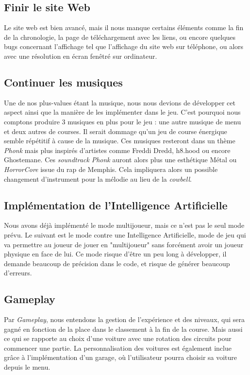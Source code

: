 \documentclass[12pt,a4paper]{article}
\newcommand{\AI}{Intelligence Artificielle}
\begin{document}
    \subsection{Finir le site Web}
        Le site web est bien avancé, mais il nous manque certains éléments 
        comme la fin de la chronologie, la page de téléchargement avec les liens,
        ou encore quelques bugs concernant l'affichage tel que l'affichage du
        site web sur téléphone, ou alors avec une résolution en écran fenêtré sur ordinateur.
        
    \subsection{Continuer les musiques}
        Une de nos plus-values étant la musique, nous nous devions de développer cet aspect
        ainsi que la manière de les implémenter dans le jeu. C'est pourquoi nous comptons
        produire 3 musiques en plus pour le jeu : une autre musique de menu et deux autres
        de courses. Il serait dommage qu'un jeu de course énergique semble répétitif à cause
        de la musique. Ces musiques resteront dans un thème \textsl{Phonk} mais plus inspirés d'artistes
        comme Freddi Dredd, h8.hood ou encore Ghostemane. Ces \textit{soundtrack} \textit{Phonk} auront alors plus
        une esthétique Métal ou \textit{HorrorCore} issue du rap de Memphis. Cela impliquera alors 
        un possible changement d'instrument pour la mélodie au lieu de la \textit{cowbell}.
        
    \subsection{Implémentation de l'\AI}
        Nous avons déjà implémenté le mode multijoueur, mais ce n'est pas le seul mode prévu.
        Le suivant est le mode contre une \AI, mode de jeu qui va permettre au joueur de jouer
        en "multijoueur" sans forcément avoir un joueur physique en face de lui. Ce mode risque
        d'être un peu long à développer, il demande beaucoup de précision dans le code, et risque
        de générer beaucoup d'erreurs.

    \subsection{Gameplay}
        Par \textit{Gameplay}, nous entendons la gestion de l'expérience et des niveaux,
        qui sera gagné en fonction de la place dans le classement à la fin de la course.
        Mais aussi ce qui se rapporte au choix d'une voiture avec une rotation des circuits pour
        commencer une partie. La personnalisation des voitures est également inclue grâce à 
        l'implémentation d'un garage, où l'utilisateur pourra choisir sa voiture depuis le menu.
\end{document}
